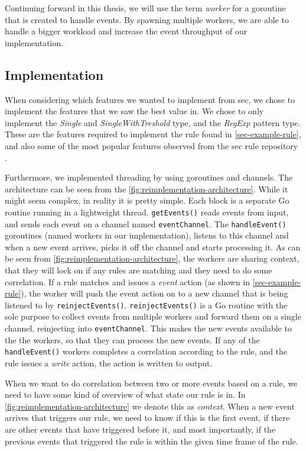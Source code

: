 Continuing forward in this thesis, we will use the term \textit{worker} for a goroutine that is created to handle events. By spawning multiple workers, we are able to handle a bigger workload and increase the event throughput of our implementation.

\subsection{Implementation}
When considering which features we wanted to implement from \acrshort{sec}, we chose to implement the features that we saw the best value in. We chose to only implement the \textit{Single} and \textit{SingleWithTreshold} type, and the \textit{RegExp} pattern type. These are the features required to implement the rule found in \cref{sec-example-rule}, and also some of the most popular features observed from the \acrshort{sec} rule repository \cite{sec-rulesets}.

Furthermore, we implemented threading by using goroutines and channels. The architecture can be seen from the \cref{fig:reimplementation-architecture}. While it might seem complex, in reality it is pretty simple. Each block is a separate Go routine running in a lightweight thread. \lstinline{getEvents()} reads events from input, and sends each event on a channel named \lstinline{eventChannel}. The \lstinline{handleEvent()} goroutines (named workers in our implementation), listens to this channel and when a new event arrives, picks it off the channel and starts processing it. As can be seen from \cref{fig:reimplementation-architecture}, the workers are sharing context, that they will lock on if any rules are matching and they need to do some correlation. If a rule matches and issues a \textit{event} action (as shown in \cref{sec-example-rule}), the worker will push the event action on to a new channel that is being listened to by \lstinline{reinjectEvents()}. \lstinline{reinjectEvents()} is a Go routine with the sole purpose to collect events from multiple workers and forward them on a single channel, reinjecting into \lstinline{eventChannel}. This makes the new events available to the the workers, so that they can process the new events. If any of the \lstinline{handleEvent()} workers completes a correlation according to the rule, and the rule issues a \textit{write} action, the action is written to output.

When we want to do correlation between two or more events based on a rule, we need to have some kind of overview of what state our rule is in. In \cref{fig:reimplementation-architecture} we denote this as \textit{context}. When a new event arrives that triggers our rule, we need to know if this is the first event, if there are other events that have triggered before it, and most importantly, if the previous events that triggered the rule is within the given time frame of the rule.


